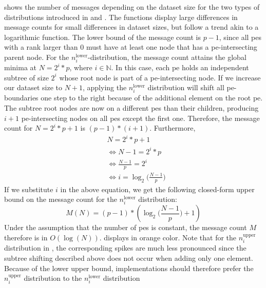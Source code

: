  shows the number of messages depending on the dataset size for the two types of distributions introduced in  and .
The functions display large differences in message counts for small differences in dataset sizes, but follow a trend akin to a logarithmic function.
The lower bound of the message count is $p - 1$, since all \glspl{pe} with a rank larger than $0$ must have at least one node that has a \gls{pe}-intersecting parent node.
For the $n_i^\textrm{lower}$-distribution, the message count attains the global minima at $N = 2^i * p$, where $i \in \mathbb{N}$.
In this case, each \gls{pe} holds an independent subtree of size $2^i$ whose root node is part of a \gls{pe}-intersecting node.
If we increase our dataset size to $N+1$, applying the $n_i^\textrm{lower}$ distribution will shift all \gls{pe}-boundaries one step to the right because of the additional element on the root \gls{pe}.
The subtree root nodes are now on a different \glspl{pe} than their children, producing $i + 1$ \gls{pe}-intersecting nodes on all \glspl{pe} except the first one.
Therefore, the message count for $N = 2^i * p + 1$ is $(p - 1) * (i + 1)$.
Furthermore,
\begin{align*}
&N = 2^i * p + 1 \\ 
&\Leftrightarrow N - 1 = 2^i * p \\
&\Leftrightarrow \frac{N - 1}{p} = 2^i \\
&\Leftrightarrow i = \log_2 \big(\frac{N - 1}{p}\big)
\end{align*}
If we substitute $i$ in the above equation, we get the following closed-form upper bound on the message count for the $n_i^\textrm{lower}$ distribution:
\begin{equation}
\label{eq:upperBoundLowerDistribution}
M(N) = (p - 1) * (\log_2 \Big( \frac{N - 1}{p} \Big) + 1)
\end{equation}
Under the assumption that the number of \glspl{pe} is constant, the message count $M$ therefore is in $O(\log(N))$.
 displays  in orange color.
Note that for the $n_i^\textrm{upper}$ distribution in , the corresponding spikes are much less pronounced since the subtree shifting described above does not occur when adding only one element.
Because of the lower upper bound, implementations should therefore prefer the $n_i^\textrm{upper}$ distribution to the $n_i^\textrm{lower}$ distribution
